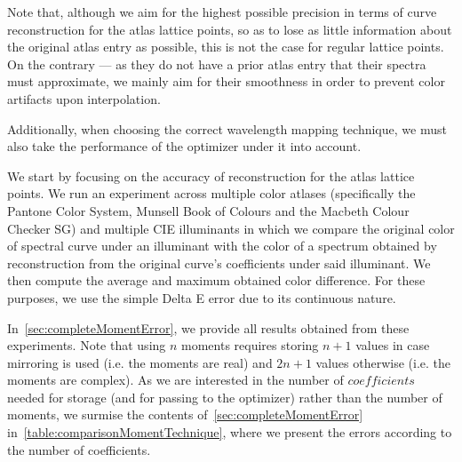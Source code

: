 Note that, although we aim for the highest possible precision in terms of curve reconstruction for the atlas lattice points, so as to lose as little information about the original atlas entry as possible, this is not the case for regular lattice points. On the contrary --- as they do not have a prior atlas entry that their spectra must approximate, we mainly aim for their smoothness in order to prevent color artifacts upon interpolation.

Additionally, when choosing the correct wavelength mapping technique, we must also take the performance of the optimizer under it into account.

We start by focusing on the accuracy of reconstruction for the atlas lattice points. We run an experiment across multiple color atlases (specifically the Pantone Color System, Munsell Book of Colours and the Macbeth Colour Checker SG) and multiple CIE illuminants in which we compare the original color of spectral curve under an illuminant with the color of a spectrum obtained by reconstruction from the original curve's coefficients under said illuminant. We then compute the average and maximum obtained color difference. For these purposes, we use the simple Delta E error due to its continuous nature.

In~\cref{sec:completeMomentError}, we provide all results obtained from these experiments. Note that using $n$ moments requires storing $n+1$ values in case mirroring is used (i.e. the moments are real) and $2n+1$ values otherwise (i.e. the moments are complex). As we are interested in the number of $coefficients$ needed for storage (and for passing to the optimizer) rather than the number of moments, we surmise the contents of~\cref{sec:completeMomentError} in~\cref{table:comparisonMomentTechnique}, where we present the errors according to the number of coefficients.

